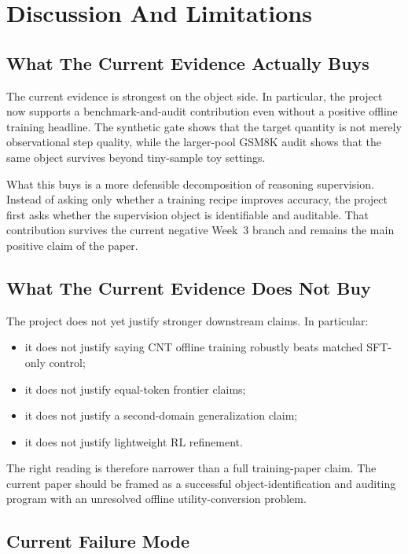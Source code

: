 \section{Discussion And Limitations}

\subsection{What The Current Evidence Actually Buys}

The current evidence is strongest on the object side. In particular, the project now supports a benchmark-and-audit contribution even without a positive offline training headline. The synthetic gate shows that the target quantity is not merely observational step quality, while the larger-pool GSM8K audit shows that the same object survives beyond tiny-sample toy settings.

What this buys is a more defensible decomposition of reasoning supervision. Instead of asking only whether a training recipe improves accuracy, the project first asks whether the supervision object is identifiable and auditable. That contribution survives the current negative Week~3 branch and remains the main positive claim of the paper.

\subsection{What The Current Evidence Does Not Buy}

The project does not yet justify stronger downstream claims. In particular:

\begin{itemize}
  \item it does not justify saying CNT offline training robustly beats matched SFT-only control;
  \item it does not justify equal-token frontier claims;
  \item it does not justify a second-domain generalization claim;
  \item it does not justify lightweight RL refinement.
\end{itemize}

The right reading is therefore narrower than a full training-paper claim. The current paper should be framed as a successful object-identification and auditing program with an unresolved offline utility-conversion problem.

\subsection{Current Failure Mode}

